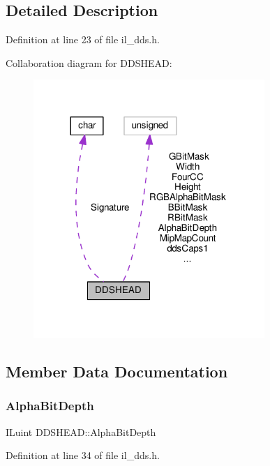 \subsection{Detailed Description}


Definition at line 23 of file il\+\_\+dds.\+h.



Collaboration diagram for D\+D\+S\+H\+E\+AD\+:
\nopagebreak
\begin{figure}[H]
\begin{center}
\leavevmode
\includegraphics[width=248pt]{d1/df4/structDDSHEAD__coll__graph}
\end{center}
\end{figure}


\subsection{Member Data Documentation}
\mbox{\label{structDDSHEAD_aac444e9516ed803bfb76a20c4e85fe75}} 
\subsubsection{\texorpdfstring{Alpha\+Bit\+Depth}{AlphaBitDepth}}
{\footnotesize\ttfamily I\+Luint D\+D\+S\+H\+E\+A\+D\+::\+Alpha\+Bit\+Depth}



Definition at line 34 of file il\+\_\+dds.\+h.

